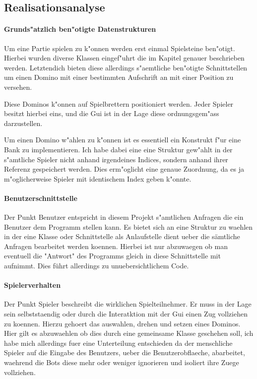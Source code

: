 \subsection{Realisationsanalyse}
\paragraph{Grunds"atzlich ben"otigte Datenstrukturen}
Um eine Partie spielen zu k"onnen werden erst einmal Spielsteine ben"otigt. Hierbei wurden diverse Klassen eingef"uhrt die im Kapitel 
genauer beschrieben werden. Letztendich bieten diese allerdings s"aemtliche ben"otigte Schnittstellen um einen Domino mit einer bestimmten Aufschrift an mit einer Position zu versehen. 

Diese Dominos k"onnen auf Spielbrettern positioniert werden. Jeder Spieler besitzt hierbei eins, und die Gui ist in der Lage diese ordnungsgem"ass darzustellen. 

Um einen Domino w"ahlen zu k"onnen ist es essentiell ein Konstrukt f"ur eine Bank zu implementieren. Ich habe dabei eine eine Struktur gew"ahlt in der s"amtliche Spieler nicht anhand irgendeines Indices, sondern anhand ihrer Referenz gespeichert werden. Dies erm"oglicht eine genaue Zuordnung, da es ja m"oglicherweise Spieler mit identischem Index geben k"onnte. 

\paragraph{Benutzerschnittstelle}
Der Punkt Benutzer entspricht in diesem Projekt s"amtlichen Anfragen die ein Benutzer dem Programm stellen kann. Es bietet sich an eine Struktur zu waehlen in der eine Klasse oder Schnittstelle als Anlaufstelle dient ueber die sämtliche Anfragen bearbeitet werden koennen. Hierbei ist nur abzuwaegen ob man eventuell die "Antwort" des Programms gleich in diese
 Schnittstelle mit aufnimmt. Dies führt allerdings zu unuebersichtlichem Code. 

\paragraph{Spielerverhalten}
Der Punkt Spieler beschreibt die wirklichen Spielteilnehmer. Er muss in der Lage sein selbststaendig oder durch die Interatktion mit der Gui einen Zug vollziehen zu koennen. Hierzu gehoert das auswahlen, drehen und setzen eines Dominos. Hier gilt es abzuwaehlen ob dies durch eine gemeinsame Klasse geschehen soll, ich habe mich allerdings fuer eine Unterteilung entschieden da der menschliche Spieler auf die Eingabe des Benutzers, ueber die Benutzerobflaeche, abarbeitet, waehrend die Bots diese mehr oder weniger ignorieren und isoliert ihre Zuege vollziehen. 

